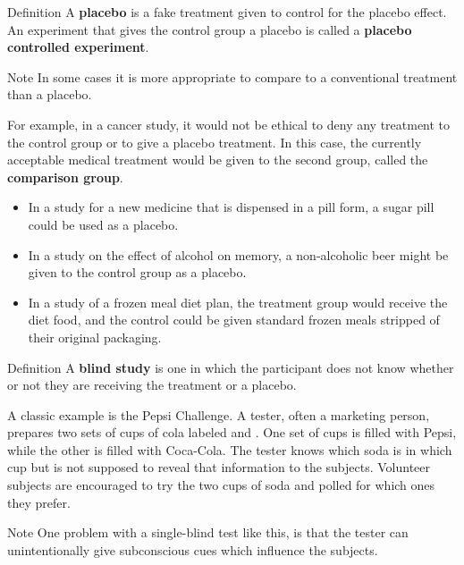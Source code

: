 \documentclass{beamer}
\begin{document}
\begin{frame}
\begin{block}{Definition}
A \textbf{placebo} is a fake treatment given to control for the placebo effect. An experiment that gives the control group a placebo is called a \textbf{placebo controlled experiment}.
\end{block}\pause

\begin{block}{Note}
In some cases it is more appropriate to compare to a conventional treatment than a placebo.

\vspace{2mm}
For example, in a cancer study, it would not be ethical to deny any treatment to the control group or to give a placebo treatment. In this case, the currently acceptable medical treatment would be given to the second group, called the \textbf{comparison group}.
\end{block}
\end{frame}

\begin{frame}
\begin{example}
\begin{itemize}[<+- | alert@+>]
\item In a study for a new medicine that is dispensed in a pill form, a sugar pill could be used as a placebo.
\item In a study on the effect of alcohol on memory, a non-alcoholic beer might be given to the control group as a placebo.
\item In a study of a frozen meal diet plan, the treatment group would receive the diet food, and the control could be given standard frozen meals stripped of their original packaging.
\end{itemize}
\end{example}
\end{frame}

\begin{frame}
\begin{block}{Definition}
A \textbf{blind study} is one in which the participant does not know whether or not they are receiving the treatment or a placebo. 
\end{block}\pause

\begin{example}
A classic example is the Pepsi Challenge. A tester, often a marketing person, prepares two sets of cups of cola labeled  and . One set of cups is filled with Pepsi, while the other is filled with Coca-Cola. The tester knows which soda is in which cup but is not supposed to reveal that information to the subjects. Volunteer subjects are encouraged to try the two cups of soda and polled for which ones they prefer.
\end{example}\pause

\begin{block}{Note}
One problem  with a single-blind test like this, is that the tester can unintentionally give subconscious cues which influence the subjects.
\end{block}
\end{frame}
\end{document}
